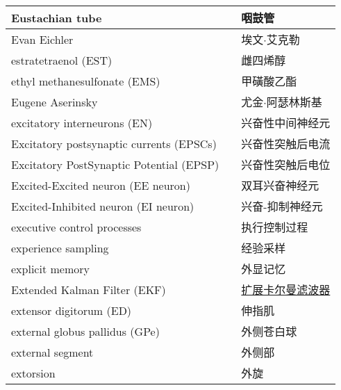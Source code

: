 \begin{longtable}{lll}
	\midrule
	Eustachian tube    &&  咽鼓管  \\
	
	\midrule
	Evan Eichler    &&  埃文$\cdot$艾克勒  \\
	
	\midrule
	estratetraenol (EST)   &&  雌四烯醇  \\
	
	\midrule
	ethyl methanesulfonate (EMS)    &&  甲磺酸乙酯  \\
	
	\midrule
	Eugene Aserinsky    &&  尤金$\cdot$阿瑟林斯基  \\
	
	\midrule
	excitatory interneurons  (EN)  &&  兴奋性中间神经元  \\
	
	\midrule
	Excitatory postsynaptic currents (EPSCs)     &&  兴奋性突触后电流  \\
	
	\midrule
	Excitatory PostSynaptic Potential (EPSP)     &&  兴奋性突触后电位  \\
	
	\midrule
	Excited-Excited neuron (EE neuron)     &&  双耳兴奋神经元  \\
	
	\midrule
	Excited-Inhibited neuron (EI neuron)     && 兴奋-抑制神经元   \\
	
	\midrule
	executive control processes     && 执行控制过程   \\
	
	\midrule
	experience sampling     && 经验采样   \\
	
	\midrule
	explicit memory     && 外显记忆   \\
	
	\midrule
	Extended Kalman Filter (EKF)     && \href{https://baike.baidu.com/item/EKF/9375021?fr=ge_ala}{扩展卡尔曼滤波器}   \\
	
	\midrule
	extensor digitorum (ED)     && 伸指肌   \\
	
	\midrule
	external globus pallidus (GPe)     && 外侧苍白球   \\
	
	\midrule
	external segment     && 外侧部   \\
	
	\midrule
	extorsion     && 外旋   \\
	

\end{longtable}
